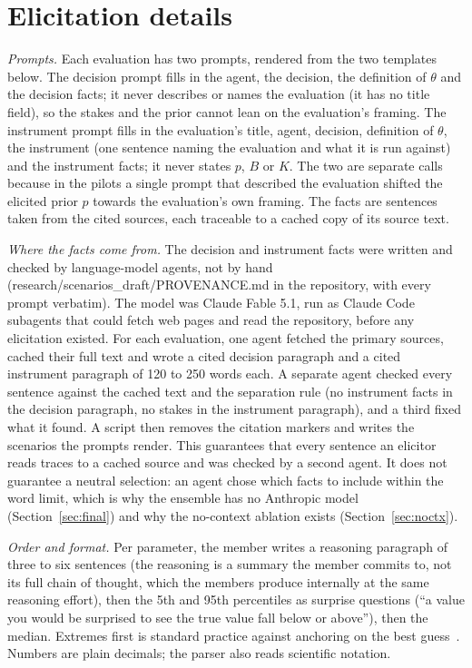 \documentclass{article}
\begin{document}
\section{Elicitation details}
\label{sec:elicitation}

\emph{Prompts.} Each evaluation has two prompts, rendered from the two templates below. The decision prompt fills in the agent, the decision, the definition of $\theta$ and the decision facts; it never describes or names the evaluation (it has no title field), so the stakes and the prior cannot lean on the evaluation's framing. The instrument prompt fills in the evaluation's title, agent, decision, definition of $\theta$, the instrument (one sentence naming the evaluation and what it is run against) and the instrument facts; it never states $p$, $B$ or $K$. The two are separate calls because in the pilots a single prompt that described the evaluation shifted the elicited prior $p$ towards the evaluation's own framing. The facts are sentences taken from the cited sources, each traceable to a cached copy of its source text.

\emph{Where the facts come from.} The decision and instrument facts were written and checked by language-model agents, not by hand (research/scenarios\_draft/PROVENANCE.md in the repository, with every prompt verbatim). The model was Claude Fable 5.1, run as Claude Code subagents that could fetch web pages and read the repository, before any elicitation existed. For each evaluation, one agent fetched the primary sources, cached their full text and wrote a cited decision paragraph and a cited instrument paragraph of 120 to 250 words each. A separate agent checked every sentence against the cached text and the separation rule (no instrument facts in the decision paragraph, no stakes in the instrument paragraph), and a third fixed what it found. A script then removes the citation markers and writes the scenarios the prompts render. This guarantees that every sentence an elicitor reads traces to a cached source and was checked by a second agent. It does not guarantee a neutral selection: an agent chose which facts to include within the word limit, which is why the ensemble has no Anthropic model (Section~\ref{sec:final}) and why the no-context ablation exists (Section~\ref{sec:noctx}).

\emph{Order and format.} Per parameter, the member writes a reasoning paragraph of three to six sentences (the reasoning is a summary the member commits to, not its full chain of thought, which the members produce internally at the same reasoning effort), then the 5th and 95th percentiles as surprise questions (``a value you would be surprised to see the true value fall below or above''), then the median. Extremes first is standard practice against anchoring on the best guess~\citep{ohagan2006uncertain}. Numbers are plain decimals; the parser also reads scientific notation.
\end{document}
